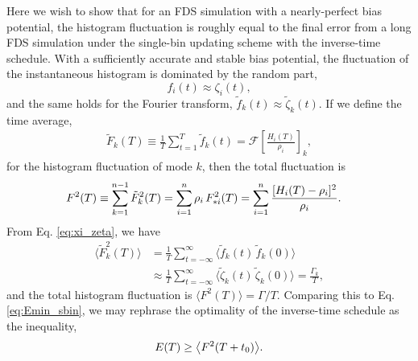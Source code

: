 \documentclass[reprint, superscriptaddress, floatfix]{revtex4-1}
\newcommand{\Err}{E}
\begin{document}
Here we wish to show that for an FDS simulation
with a nearly-perfect bias potential,
the histogram fluctuation
is roughly equal to the final error
from a long FDS simulation under the single-bin updating scheme
with the inverse-time schedule.
%
With a sufficiently accurate and stable bias potential,
the fluctuation of
the instantaneous histogram is dominated by the random part,
%
\begin{equation}
  f_i(t) \approx \zeta_i(t)
  ,
  \label{eq:xi_zeta}
\end{equation}
and the same holds for the Fourier transform,
$\tilde f_k(t) \approx \tilde \zeta_k(t).$
%
If we define the time average,
%
\begin{align*}
\tilde F_k(T) \equiv \frac 1 T \sum_{t = 1}^T \tilde f_k(t)
=\mathcal F\left[ \frac{ H_i(T) } { \rho_i } \right]_k
,
\end{align*}
%
for the histogram fluctuation of mode $k$,
then the total fluctuation is
%
\begin{align}
  F^2(T)
  &\equiv
  \sum_{k=1}^{n-1} \tilde F_k^2(T)
  =
  \sum_{i=1}^{n} \rho_i \, F_{*i}^2(T)
  =
  \sum_{i=1}^n
  \frac{ [ H_i(T) -\rho_i]^2 }{\rho_i}
  .
  \notag
\end{align}
%
From Eq. \eqref{eq:xi_zeta}, we have
%
\begin{align*}
\bigl\langle \tilde F_k^2(T) \bigr\rangle
&=
\frac{1}{T}
\sum_{t=-\infty}^\infty
\bigl\langle
  \tilde f_k(t) \, \tilde f_k(0)
\bigr\rangle
\\
&\approx
\frac{1}{T}
\sum_{t=-\infty}^\infty
\bigl\langle
  \tilde \zeta_k(t) \, \tilde \zeta_k(0)
\bigr\rangle
=
\frac{ \Gamma_k } { T }
,
\end{align*}
%
and the total histogram fluctuation is
$\bigl\langle F^2(T) \bigr\rangle = \Gamma/T$.
%
Comparing this to Eq. \eqref{eq:Emin_sbin},
we may rephrase the optimality of the inverse-time schedule
as the inequality,
\begin{equation}
  \Err(T)
  \ge
  \bigl\langle F^2(T+t_0) \bigr\rangle
  .
  \notag
\end{equation}
%
\end{document}
